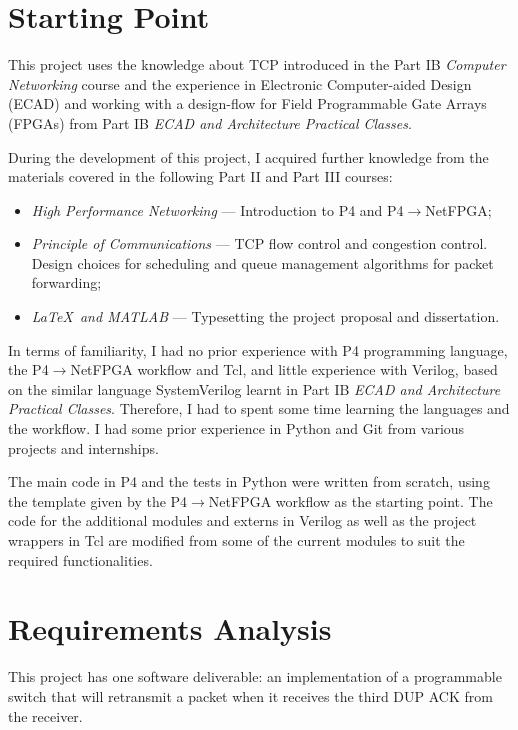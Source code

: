 \section{Starting Point} 
\label{sec:start}
	This project uses the knowledge about TCP introduced in the Part IB \textit{Computer Networking} course and the experience in Electronic Computer-aided Design (ECAD) and working with a design-flow for Field Programmable Gate Arrays (FPGAs) from Part IB \textit{ECAD and Architecture Practical Classes}.
	
	During the development of this project, I acquired further knowledge from the materials covered in the following Part II and Part III courses:%
	
	\begin{itemize}
		\item \textit{High Performance Networking} --- Introduction to P4 and P4$\rightarrow$NetFPGA;%
		\item \textit{Principle of Communications} --- TCP flow control and congestion control. Design choices for scheduling and queue management algorithms for packet forwarding;%
		\item \textit{\LaTeX \ and MATLAB} --- Typesetting the project proposal and dissertation.%
	\end{itemize}
	
	In terms of familiarity, I had no prior experience with P4 programming language, the P4$\rightarrow$NetFPGA workflow and Tcl, and little experience with Verilog, based on the similar language SystemVerilog learnt in Part IB \textit{ECAD and Architecture Practical Classes}. Therefore, I had to spent some time learning the languages and the workflow. I had some prior experience in Python and Git from various projects and internships.
	
	The main code in P4 and the tests in Python were written from scratch, using the template given by the P4$\rightarrow$NetFPGA workflow as the starting point. The code for the additional modules and externs in Verilog as well as the project wrappers in Tcl are modified from some of the current modules to suit the required functionalities.
	
\section{Requirements Analysis}
This project has one software deliverable: an implementation of a programmable switch that will retransmit a packet when it receives the third DUP ACK from the receiver.

